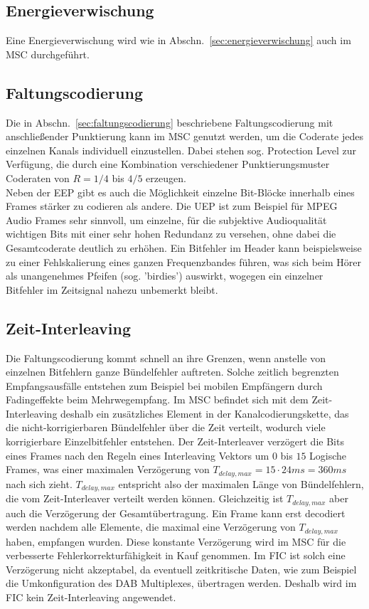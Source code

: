 \subsection{Energieverwischung}
Eine Energieverwischung wird wie in Abschn.~\ref{sec:energieverwischung} auch im \ac{MSC} durchgeführt.

\subsection{Faltungscodierung}
Die in Abschn.~\ref{sec:faltungscodierung} beschriebene Faltungscodierung mit anschließender Punktierung kann im \ac{MSC} genutzt werden, um die Coderate jedes einzelnen Kanals individuell einzustellen. Dabei stehen sog. Protection Level zur Verfügung, die durch eine Kombination verschiedener Punktierungsmuster Coderaten von $R=1/4$ bis $4/5$ erzeugen.\\
Neben der \ac{EEP} gibt es auch die Möglichkeit einzelne Bit-Blöcke innerhalb eines Frames stärker zu codieren als andere. Die \ac{UEP} ist zum Beispiel für MPEG Audio Frames sehr sinnvoll, um einzelne, für die subjektive Audioqualität wichtigen Bits mit einer sehr hohen Redundanz zu versehen, ohne dabei die Gesamtcoderate deutlich zu erhöhen. Ein Bitfehler im Header kann beispielsweise zu einer Fehlskalierung eines ganzen Frequenzbandes führen, was sich beim Hörer als unangenehmes Pfeifen (sog. 'birdies') auswirkt, wogegen ein einzelner Bitfehler im Zeitsignal nahezu unbemerkt bleibt.

\subsection{Zeit-Interleaving}
\label{sec:time_interleaving_std}
Die Faltungscodierung kommt schnell an ihre Grenzen, wenn anstelle von einzelnen Bitfehlern ganze Bündelfehler auftreten. Solche zeitlich begrenzten Empfangsausfälle entstehen zum Beispiel bei mobilen Empfängern durch Fadingeffekte beim Mehrwegempfang. Im \ac{MSC} befindet sich mit dem Zeit-Interleaving deshalb ein zusätzliches Element in der Kanalcodierungskette, das die nicht-korrigierbaren Bündelfehler über die Zeit verteilt, wodurch viele korrigierbare Einzelbitfehler entstehen. Der Zeit-Interleaver verzögert die Bits eines Frames nach den Regeln eines Interleaving Vektors um $0$ bis $15$ Logische Frames, was einer maximalen Verzögerung von $T_{delay, max} = 15 \cdot 24ms = 360 ms$ nach sich zieht. $T_{delay, max}$ entspricht also der maximalen Länge von Bündelfehlern, die vom Zeit-Interleaver verteilt werden können. Gleichzeitig ist $T_{delay, max}$ aber auch die Verzögerung der Gesamtübertragung. Ein Frame kann erst decodiert werden nachdem alle Elemente, die maximal eine Verzögerung von $T_{delay, max}$ haben, empfangen wurden. Diese konstante Verzögerung wird im MSC für die verbesserte Fehlerkorrekturfähigkeit in Kauf genommen. Im FIC ist solch eine Verzögerung nicht akzeptabel, da eventuell zeitkritische Daten, wie zum Beispiel die Umkonfiguration des DAB Multiplexes, übertragen werden. Deshalb wird im FIC kein Zeit-Interleaving angewendet.

